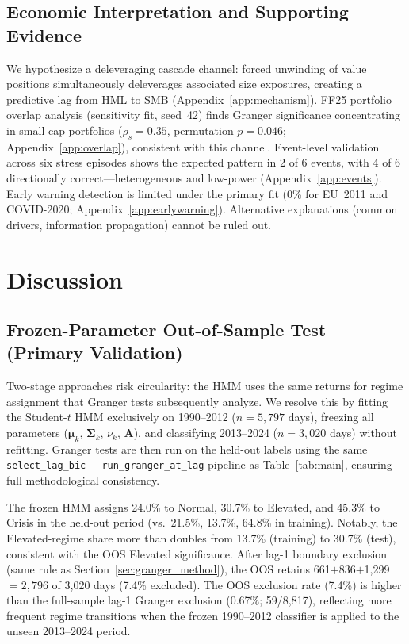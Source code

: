 \documentclass[sigconf,anonymous]{acmart}
\begin{document}
\subsection{Economic Interpretation and Supporting Evidence}
\label{sec:interpretation}
\label{sec:overlap_evidence}
\label{sec:oos}
We hypothesize a deleveraging cascade channel: forced unwinding of value positions
simultaneously deleverages associated size exposures, creating a predictive lag from
HML to SMB (Appendix~\ref{app:mechanism}). FF25 portfolio overlap analysis (sensitivity
fit, seed~42) finds Granger significance concentrating in small-cap portfolios
($\rho_s = 0.35$, permutation $p = 0.046$; Appendix~\ref{app:overlap}), consistent
with this channel. Event-level validation across six stress episodes shows the expected
pattern in 2 of 6 events, with 4 of 6 directionally correct---heterogeneous and low-power
(Appendix~\ref{app:events}). Early warning detection is limited under the primary fit
(0\% for EU~2011 and COVID-2020; Appendix~\ref{app:earlywarning}).
Alternative explanations (common drivers, information propagation) cannot be ruled out.

\section{Discussion}

\subsection{Frozen-Parameter Out-of-Sample Test (Primary Validation)}
\label{sec:frozen_oos}

Two-stage approaches risk circularity: the HMM uses the same returns for
regime assignment that Granger tests subsequently analyze.
We resolve this by fitting the Student-$t$ HMM exclusively on 1990--2012
($n = 5{,}797$ days), freezing all parameters
($\boldsymbol{\mu}_k$, $\boldsymbol{\Sigma}_k$, $\nu_k$, $\mathbf{A}$),
and classifying 2013--2024 ($n = 3{,}020$ days) without refitting.
Granger tests are then run on the held-out labels using the same
\texttt{select\_lag\_bic} + \texttt{run\_granger\_at\_lag} pipeline as Table~\ref{tab:main},
ensuring full methodological consistency.

The frozen HMM assigns 24.0\% to Normal, 30.7\% to Elevated, and 45.3\%
to Crisis in the held-out period (vs.\ 21.5\%, 13.7\%, 64.8\% in training).
Notably, the Elevated-regime share more than doubles from 13.7\% (training)
to 30.7\% (test), consistent with the OOS Elevated significance.
After lag-1 boundary exclusion (same rule as Section~\ref{sec:granger_method}),
the OOS retains 661$+$836$+$1{,}299$=2{,}796$ of 3,020 days (7.4\% excluded).
The OOS exclusion rate (7.4\%) is higher than the full-sample lag-1 Granger exclusion
(0.67\%; 59/8,817), reflecting more frequent regime transitions when the
frozen 1990--2012 classifier is applied to the unseen 2013--2024 period.
\end{document}
